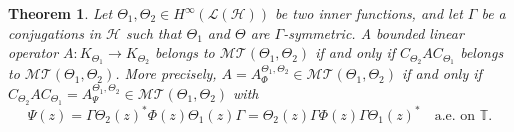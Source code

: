 \documentclass[12pt]{amsart}
\numberwithin{equation}{section}
\newcommand{\hsp}{\mathcal{H}}
\newcommand{\oL }{\mathcal{L}(\hsp) }
\newtheorem{theorem}{Theorem}[section]
\theoremstyle{definition}
\numberwithin{equation}{section}
\begin{document}
\begin{theorem}\cite[Theorem 4.5]{RYJ}\label{LT}
Let $\Theta_{1}, \Theta_{2}\in H^{\infty}(\oL)$ be two inner functions, and let $\Gamma$ be a conjugations in $\hsp$ such that $\Theta_{1}$ and $\Theta$ are $\Gamma$-symmetric. A bounded linear operator $A:K_{\Theta_{1}}\to K_{\Theta_{2}}$ belongs to $\mathcal{MT}(\Theta_{1}, \Theta_{2})$ if and only if $C_{\Theta_{2}}AC_{\Theta_{1}}$ belongs to $\mathcal{MT}(\Theta_{1}, \Theta_{2})$. More precisely, $A=A_{\Phi}^{\Theta_{1}, \Theta_{2}}\in \mathcal{MT}(\Theta_{1}, \Theta_{2})$ if and only if $C_{\Theta_{2}}AC_{\Theta_{1}}=A_{\Psi}^{\Theta_{1},\Theta_{2}}\in \mathcal{MT}(\Theta_{1}, \Theta_{2})$ with
\begin{equation}
\Psi(z)=\Gamma\Theta_{2}(z)^*\Phi(z)\Theta_{1}(z)\Gamma
=\Theta_{2}(z)\Gamma\Phi(z)\Gamma\Theta_{1}(z)^*\quad \text{a.e. on } \mathbb{T}.
\end{equation}
\end{theorem}

\medskip
\end{document}
